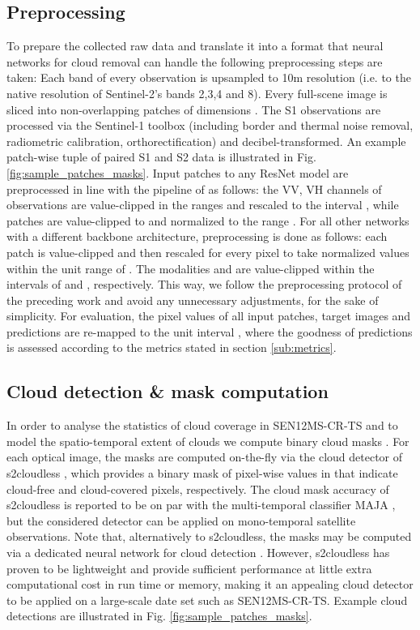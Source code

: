 \documentclass[journal]{IEEEtran}
\begin{document}
\subsection{Preprocessing} \label{preprocessing}

To prepare the collected raw data and translate it into a format that neural networks for cloud removal can handle the following preprocessing steps are taken: Each band of every observation is upsampled to 10m resolution (i.e. to the native resolution of Sentinel-2's bands 2,3,4 and 8). Every full-scene image is sliced into non-overlapping patches of dimensions . The S1 observations are processed via the Sentinel-1 toolbox \cite{veci2014sentinel} (including border and thermal noise removal, radiometric calibration, orthorectification) and decibel-transformed. An example patch-wise tuple of paired S1 and S2 data is illustrated in Fig. \ref{fig:sample_patches_masks}. Input patches to any ResNet model \cite{he2016deep} are preprocessed in line with the pipeline of \cite{meraner2020cloud} as follows: the VV, VH channels of  observations are value-clipped in the ranges  and rescaled to the interval , while  patches are value-clipped to  and normalized to the range . For all other networks with a different backbone architecture, preprocessing is done as follows: each patch is value-clipped and then rescaled for every pixel to take normalized values within the unit range of . The modalities  and  are value-clipped within the intervals of  and , respectively. This way, we follow the preprocessing protocol of the preceding work and avoid any unnecessary adjustments, for the sake of simplicity. For evaluation, the pixel values of all input patches, target images and predictions are re-mapped to the unit interval , where the goodness of predictions is assessed according to the metrics stated in section \ref{sub:metrics}.

\subsection{Cloud detection \& mask computation} \label{sub:cloudmask}
In order to analyse the statistics of cloud coverage in SEN12MS-CR-TS and to model the spatio-temporal extent of clouds we compute binary cloud masks . For each optical image, the masks  are computed on-the-fly via the cloud detector of s2cloudless \cite{Zupanc}, which provides a binary mask of pixel-wise values in  that indicate cloud-free and cloud-covered pixels, respectively. The cloud mask accuracy of s2cloudless is reported to be on par with the multi-temporal classifier MAJA \cite{lonjou2016maccs}, but the considered detector can be applied on mono-temporal satellite observations. Note that, alternatively to s2cloudless, the masks  may be computed via a dedicated neural network for cloud detection \cite{jeppesen2019cloud, lopez2021benchmarking}. However, s2cloudless has proven to be lightweight and provide sufficient performance at little extra computational cost in run time or memory, making it an appealing cloud detector to be applied on a large-scale date set such as SEN12MS-CR-TS. Example cloud detections are illustrated in Fig. \ref{fig:sample_patches_masks}.
\end{document}
